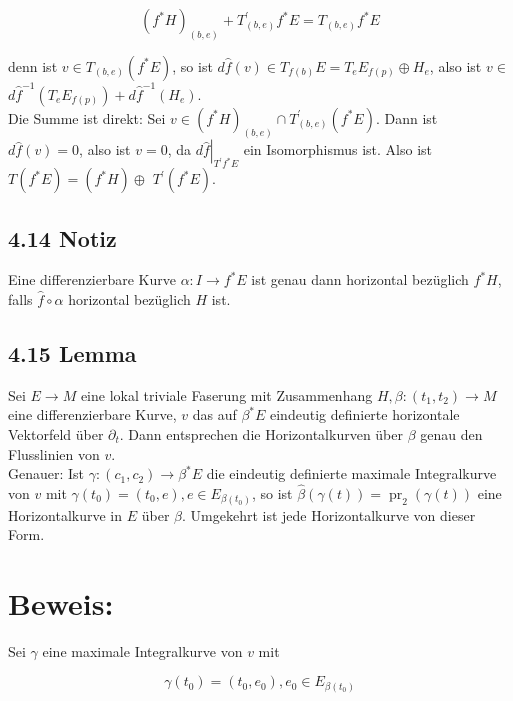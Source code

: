 \documentclass[10pt, letterpaper]{article}
\begin{document}
$$
\left(f^{*} H\right)_{(b, e)}+T_{(b, e)}^{\prime} f^{*} E=T_{(b, e)} f^{*} E
$$

denn ist $v \in T_{(b, e)}\left(f^{*} E\right)$, so ist $d \hat{f}(v) \in T_{f(b)} E=T_{e} E_{f(p)} \oplus H_{e}$, also ist $v \in$ $d \hat{f}^{-1}\left(T_{e} E_{f(p)}\right)+d \hat{f}^{-1}\left(H_{e}\right)$.\\
Die Summe ist direkt: Sei $v \in\left(f^{*} H\right)_{(b, e)} \cap T_{(b, e)}^{\prime}\left(f^{*} E\right)$. Dann ist $d \hat{f}(v)=0$, also ist $v=0$, da $\left.d \hat{f}\right|_{T^{\prime} f^{*} E}$ ein Isomorphismus ist. Also ist $T\left(f^{*} E\right)=\left(f^{*} H\right) \oplus$ $T^{\prime}\left(f^{*} E\right)$.

\subsection*{4.14 Notiz}
Eine differenzierbare Kurve $\alpha: I \rightarrow f^{*} E$ ist genau dann horizontal bezüglich $f^{*} H$, falls $\hat{f} \circ \alpha$ horizontal bezüglich $H$ ist.

\subsection*{4.15 Lemma}
Sei $E \rightarrow M$ eine lokal triviale Faserung mit Zusammenhang $H, \beta:\left(t_{1}, t_{2}\right) \rightarrow M$ eine differenzierbare Kurve, $v$ das auf $\beta^{*} E$ eindeutig definierte horizontale Vektorfeld über $\partial_{t}$. Dann entsprechen die Horizontalkurven über $\beta$ genau den Flusslinien von $v$.\\
Genauer: Ist $\gamma:\left(c_{1}, c_{2}\right) \rightarrow \beta^{*} E$ die eindeutig definierte maximale Integralkurve von $v$ mit $\gamma\left(t_{0}\right)=\left(t_{0}, e\right), e \in E_{\beta\left(t_{0}\right)}$, so ist $\hat{\beta}(\gamma(t))=\operatorname{pr}_{2}(\gamma(t))$ eine Horizontalkurve in $E$ über $\beta$. Umgekehrt ist jede Horizontalkurve von dieser Form.

\section*{Beweis:}
Sei $\gamma$ eine maximale Integralkurve von $v$ mit


\begin{equation*}
\gamma\left(t_{0}\right)=\left(t_{0}, e_{0}\right), e_{0} \in E_{\beta\left(t_{0}\right)} \tag{4.2}
\end{equation*}
\end{document}

